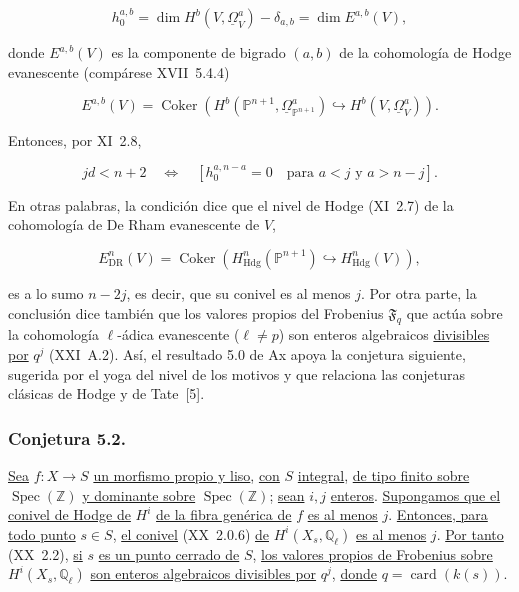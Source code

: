 \begin{equation}\tag{5.1.2}
h_0^{a,b}
=\dim H^b(V,\underline{\Omega}_V^a)-\delta_{a,b}
=\dim E^{a,b}(V),
\end{equation}

donde $E^{a,b}(V)$ es la componente de bigrado $(a,b)$ de la cohomología
de Hodge evanescente (compárese XVII~5.4.4)

\begin{equation}\tag{5.1.3}
E^{a,b}(V)
=\operatorname{Coker}\!\left(
H^b(\mathbb P^{n+1},\underline{\Omega}_{\mathbb P^{n+1}}^a)
\hookrightarrow H^b(V,\underline{\Omega}_V^a)\right).
\end{equation}

Entonces, por XI~2.8,

\begin{equation}\tag{5.1.4}
jd<n+2
\quad\Longleftrightarrow\quad
\left[h_0^{a,n-a}=0\quad\text{para }a<j\text{ y }a>n-j\right].
\end{equation}

En otras palabras, la condición dice que el nivel de Hodge (XI~2.7) de la
cohomología de De Rham evanescente de $V$,

\[
E_{\mathrm{DR}}^n(V)
=\operatorname{Coker}\!\left(
H_{\mathrm{Hdg}}^n(\mathbb P^{n+1})
\hookrightarrow H_{\mathrm{Hdg}}^n(V)\right),
\]

\pageoriginale

es a lo sumo $n-2j$, es decir, que su conivel es al menos $j$. Por otra
parte, la conclusión dice también que los valores propios del Frobenius
$\mathfrak F_q$ que actúa sobre la cohomología $\ell$-ádica evanescente
($\ell\ne p$) son enteros algebraicos \underline{divisibles por} $q^j$ (XXI~A.2).
Así, el resultado 5.0 de Ax apoya la conjetura siguiente, sugerida por el
yoga del nivel de los motivos y que relaciona las conjeturas clásicas de
Hodge y de Tate~[5].

\subsubsection*{Conjetura 5.2.}
\underline{Sea} $f:X\to S$ \underline{un morfismo propio y liso}, \underline{con} $S$ \underline{integral}, \underline{de tipo finito
sobre} $\operatorname{Spec}(\mathbb Z)$ \underline{y dominante sobre}
$\operatorname{Spec}(\mathbb Z)$; \underline{sean} $i,j$ \underline{enteros}. \underline{Supongamos que el
conivel de Hodge de} $H^i$ \underline{de la fibra genérica de} $f$ \underline{es al menos} $j$.
\underline{Entonces, para todo punto} $s\in S$, \underline{el conivel} (XX~2.0.6) \underline{de}
$H^i(X_s,\mathbb Q_\ell)$ \underline{es al menos} $j$. \underline{Por tanto} (XX~2.2), \underline{si} $s$ \underline{es
un punto cerrado de} $S$, \underline{los valores propios de Frobenius sobre}
$H^i(X_s,\mathbb Q_\ell)$ \underline{son enteros algebraicos divisibles por} $q^j$,
\underline{donde} $q=\operatorname{card}(k(s))$.

